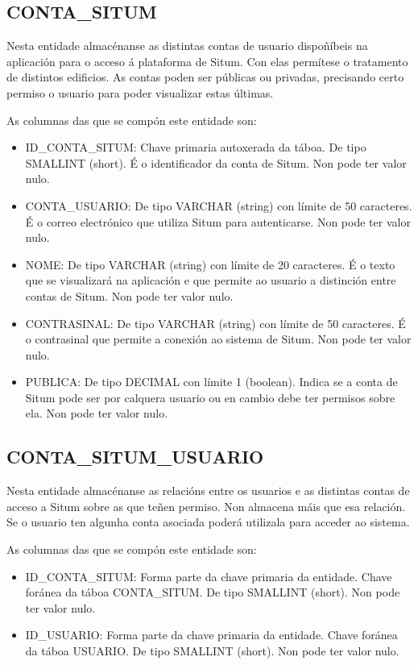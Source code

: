 \subsection{CONTA\_SITUM}
Nesta entidade almacénanse as distintas contas de usuario dispoñíbeis na aplicación para o acceso á plataforma de Situm. Con elas permítese o tratamento de distintos edificios. As contas poden ser públicas ou privadas, precisando certo permiso o usuario para poder visualizar estas últimas.

As columnas das que se compón este entidade son:
\begin{itemize}
	\item ID\_CONTA\_SITUM: Chave primaria autoxerada da táboa. De tipo SMALLINT (short). É o identificador da conta de Situm. Non pode ter valor nulo.
	\item CONTA\_USUARIO: De tipo VARCHAR (string) con límite de 50 caracteres. É o correo electrónico que utiliza Situm para autenticarse. Non pode ter valor nulo.
	\item NOME: De tipo VARCHAR (string) con límite de 20 caracteres. É o texto que se visualizará na aplicación e que permite ao usuario a distinción entre contas de Situm. Non pode ter valor nulo.
	\item CONTRASINAL: De tipo VARCHAR (string) con límite de 50 caracteres. É o contrasinal que permite a conexión ao sistema de Situm. Non pode ter valor nulo.
	\item PUBLICA: De tipo DECIMAL con límite 1 (boolean). Indica se a conta de Situm pode ser por calquera usuario ou en cambio debe ter permisos sobre ela. Non pode ter valor nulo.
\end{itemize}


\subsection{CONTA\_SITUM\_USUARIO}
Nesta entidade almacénanse as relacións entre os usuarios e as distintas contas de acceso a Situm sobre as que teñen permiso. Non almacena máis que esa relación. Se o usuario ten algunha conta asociada poderá utilizala para acceder ao sistema.

As columnas das que se compón este entidade son:
\begin{itemize}
	\item ID\_CONTA\_SITUM: Forma parte da chave primaria da entidade. Chave foránea da táboa CONTA\_SITUM. De tipo SMALLINT (short). Non pode ter valor nulo.
	\item ID\_USUARIO: Forma parte da chave primaria da entidade. Chave foránea da táboa USUARIO. De tipo SMALLINT (short). Non pode ter valor nulo.
\end{itemize}


